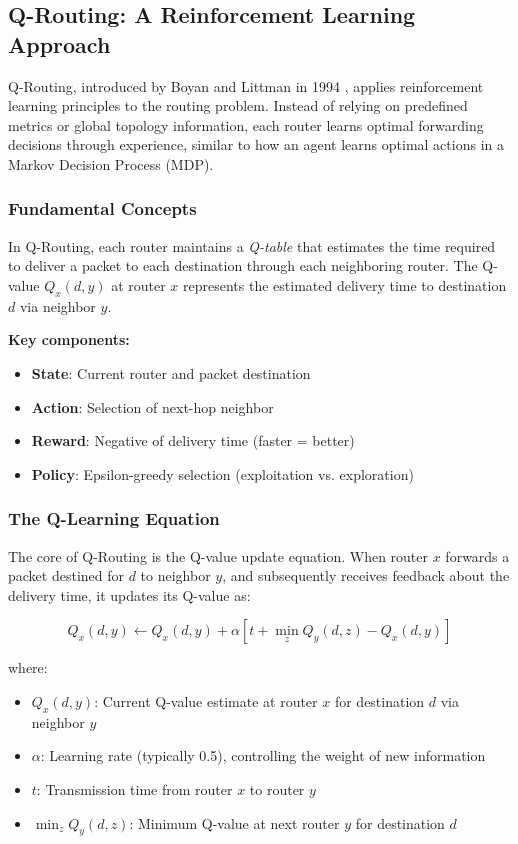 \documentclass[12pt,a4paper]{article}
\begin{document}
\subsection{Q-Routing: A Reinforcement Learning Approach}

Q-Routing, introduced by Boyan and Littman in 1994 \cite{boyan1994packet}, applies reinforcement learning principles to the routing problem. Instead of relying on predefined metrics or global topology information, each router learns optimal forwarding decisions through experience, similar to how an agent learns optimal actions in a Markov Decision Process (MDP).

\subsubsection{Fundamental Concepts}

In Q-Routing, each router maintains a \textit{Q-table} that estimates the time required to deliver a packet to each destination through each neighboring router. The Q-value $Q_x(d,y)$ at router $x$ represents the estimated delivery time to destination $d$ via neighbor $y$.

\textbf{Key components:}
\begin{itemize}
    \item \textbf{State}: Current router and packet destination
    \item \textbf{Action}: Selection of next-hop neighbor
    \item \textbf{Reward}: Negative of delivery time (faster = better)
    \item \textbf{Policy}: Epsilon-greedy selection (exploitation vs. exploration)
\end{itemize}

\subsubsection{The Q-Learning Equation}

The core of Q-Routing is the Q-value update equation. When router $x$ forwards a packet destined for $d$ to neighbor $y$, and subsequently receives feedback about the delivery time, it updates its Q-value as:

\begin{equation}
Q_x(d,y) \leftarrow Q_x(d,y) + \alpha \left[ t + \min_{z} Q_y(d,z) - Q_x(d,y) \right]
\label{eq:qrouting}
\end{equation}

where:
\begin{itemize}
    \item $Q_x(d,y)$: Current Q-value estimate at router $x$ for destination $d$ via neighbor $y$
    \item $\alpha$: Learning rate (typically 0.5), controlling the weight of new information
    \item $t$: Transmission time from router $x$ to router $y$
    \item $\min_{z} Q_y(d,z)$: Minimum Q-value at next router $y$ for destination $d$
\end{itemize}
\end{document}
